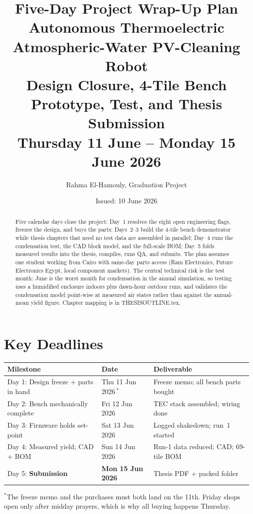 \documentclass[11pt,a4paper]{article}
\title{\textbf{Five-Day Project Wrap-Up Plan}\\[0.4em]
\large Autonomous Thermoelectric Atmospheric-Water PV-Cleaning Robot\\[0.2em]
\normalsize Design Closure, 4-Tile Bench Prototype, Test, and Thesis Submission\\
Thursday 11 June -- Monday 15 June 2026}
\author{Rahma El-Hamouly, Graduation Project}
\date{Issued: 10 June 2026}
\newcommand{\f}[1]{{\ttfamily\def\_{\textunderscore\allowbreak}#1}}
\begin{document}
\maketitle

\begin{abstract}
\noindent
Five calendar days close the project: Day~1 resolves the eight open engineering
flags, freezes the design, and buys the parts; Days~2--3 build the 4-tile bench
demonstrator while thesis chapters that need no test data are assembled in
parallel; Day~4 runs the condensation test, the CAD block model, and the
full-scale BOM; Day~5 folds measured results into the thesis, compiles, runs
QA, and submits. The plan assumes one student working from Cairo with same-day
parts access (Ram Electronics, Future Electronics Egypt, local component
markets). The central technical risk is the test month: June is the worst
month for condensation in the annual simulation, so testing uses a humidified
enclosure indoors plus dawn-hour outdoor runs, and validates the condensation
model point-wise at measured air states rather than against the annual-mean
yield figure. Chapter mapping is in \f{THESIS\_OUTLINE.tex}.
\end{abstract}

\tableofcontents
\newpage

\section{Key Deadlines}
\begin{center}
\small
\renewcommand{\arraystretch}{1.35}
\begin{tabular}{@{}lll@{}}
\toprule
\textbf{Milestone} & \textbf{Date} & \textbf{Deliverable} \\
\midrule
\rowcolor{rowA}
Day 1: Design freeze + parts in hand & Thu 11 Jun 2026\,$^{*}$ & Freeze memo; all bench parts bought \\
\rowcolor{rowB}
Day 2: Bench mechanically complete   & Fri 12 Jun 2026 & TEC stack assembled; wiring done \\
\rowcolor{rowB}
Day 3: Firmware holds set-point      & Sat 13 Jun 2026 & Logged shakedown; run~1 started \\
\rowcolor{rowC}
Day 4: Measured yield; CAD + BOM     & Sun 14 Jun 2026 & Run-1 data reduced; CAD; 69-tile BOM \\
\rowcolor{rowD}
Day 5: \textbf{Submission}           & \textbf{Mon 15 Jun 2026} & Thesis PDF + packed folder \\
\bottomrule
\end{tabular}

{\footnotesize $^{*}$The freeze memo and the purchases must both land on the
11th. Friday shops open only after midday prayers, which is why all buying
happens Thursday.}
\end{center}
\end{document}
